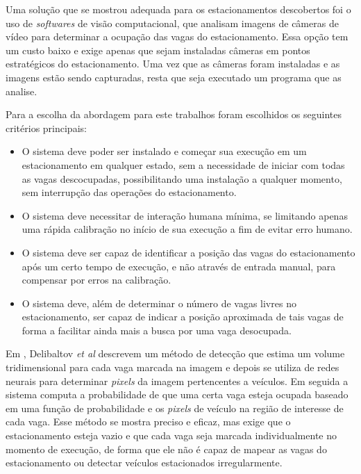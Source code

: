Uma solução que se mostrou adequada para os estacionamentos descobertos foi o uso de \textit{softwares} de visão computacional, que analisam imagens de câmeras de vídeo para determinar a ocupação das vagas do estacionamento. Essa opção tem um custo baixo e exige apenas que sejam instaladas câmeras em pontos estratégicos do estacionamento. Uma vez que as câmeras foram instaladas e as imagens estão sendo capturadas, resta que seja executado um programa que as analise.

Para a escolha da abordagem para este trabalhos foram escolhidos os seguintes critérios principais:

\begin{itemize}
	
	\item O sistema deve poder ser instalado e começar sua execução em um estacionamento em qualquer estado, sem a necessidade de iniciar com todas as vagas descocupadas, possibilitando uma instalação a qualquer momento, sem interrupção das operações do estacionamento.
	\item O sistema deve necessitar de interação humana mínima, se limitando apenas uma rápida calibração no início de sua execução a fim de evitar erro humano.
	\item O sistema deve ser capaz de identificar a posição das vagas do estacionamento após um certo tempo de execução, e não através de entrada manual, para compensar por erros na calibração.
	\item O sistema deve, além de determinar o número de vagas livres no estacionamento, ser capaz de indicar a posição aproximada de tais vagas de forma a facilitar ainda mais a busca por uma vaga desocupada.
	
\end{itemize}

Em \cite{delibaltov2013parking}, Delibaltov \textit{et al} descrevem um método de detecção que estima um volume tridimensional para cada vaga marcada na imagem e depois se utiliza de redes neurais para determinar \textit{pixels} da imagem pertencentes a veículos. Em seguida a sistema computa a probabilidade de que uma certa vaga esteja ocupada baseado em uma função de probabilidade e os \textit{pixels} de veículo na região de interesse de cada vaga. Esse método se mostra preciso e eficaz, mas exige que o estacionamento esteja vazio e que cada vaga seja marcada individualmente no momento de execução, de forma que ele não é capaz de mapear as vagas do estacionamento ou detectar veículos estacionados irregularmente.

